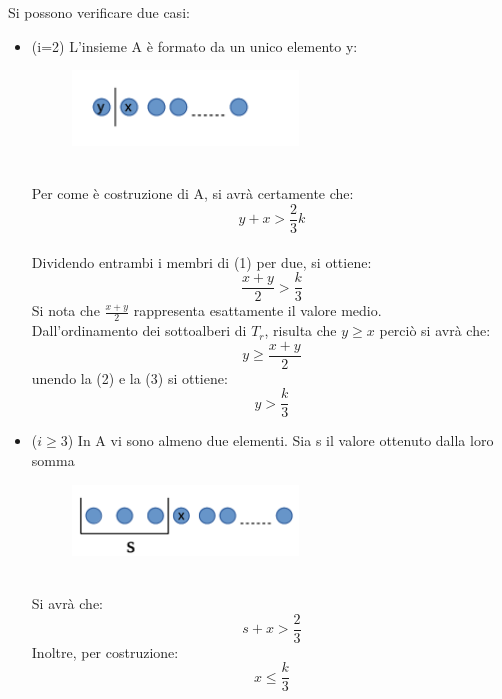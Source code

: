 Si possono verificare  due casi:
\begin{itemize}
	\item (i=2)  L’insieme A \`e formato da un unico elemento y:
		\begin{figure}[htbp]
		\centering
		\includegraphics[width=6cm]{capitolo3/4}
			\caption{}
	\end{figure}\\
Per come \`e costruzione di A, si avr\`a certamente che:
\\
\begin{equation}
 y + x > \frac{2}{3}k
\end{equation}
\\
Dividendo entrambi i membri di (1) per  due, si ottiene:
\\
\begin{equation}
\frac{ x + y }{2} > \frac{k}{3}  
\end{equation}
Si nota che $\frac{ x + y }{2} $ rappresenta esattamente il valore medio. \\
Dall’ordinamento dei sottoalberi di $T_r$, risulta che $y \ge x$ perci\`o si avr\`a che:
\begin{equation}
y \ge \frac{ x + y }{2} 
\end{equation}
unendo la (2) e la (3)  si ottiene:
\begin{equation*}
y > \frac{k}{3}  
\end{equation*}
\item ($i\ge3$) In A vi sono almeno due elementi. Sia s il valore ottenuto dalla loro somma 
	\begin{figure}[htbp]
	\centering
	\includegraphics[width=6cm]{capitolo3/5}
		\caption{}
\end{figure}\\
Si avr\`a che:
\begin{equation}
s+ x > \frac{2}{3}
\end{equation}
Inoltre, per costruzione:
\begin{equation}
x \le \frac{k}{3}
\end{equation}

\end{itemize}
